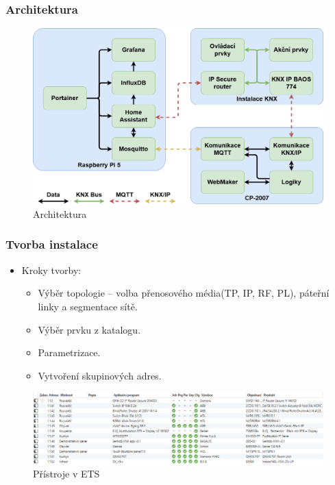 \documentclass[%
  12pt,       				%
	t,                  %
	aspectratio=1610,   %
	unicode,						%
]{beamer}				    	%
\begin{document}
\begin{frame} 
	\frametitle{Architektura}
			\begin{figure} [!ht]
				\centering
				\includegraphics[width=0.75\columnwidth]{obrazky/architecture.png}
				\caption{Architektura}
			\end{figure}
\end{frame}

\begin{frame} 
	\frametitle{Tvorba instalace}
	\begin{itemize}
		\item Kroky tvorby:
			\begin{itemize}
				\item Výběr topologie – volba přenosového média(TP, IP, RF, PL), páteřní linky a segmentace sítě.
				\item Výběr prvku z katalogu.
				\item Parametrizace.
				\item Vytvoření skupinových adres.
			\end{itemize}
	\end{itemize}
	\begin{figure} [!ht]	
		\centering
		\vspace{0.2cm}	              %
		\includegraphics[width=0.8\columnwidth]{obrazky/Přístroje v ETS.png}
		\caption{Přístroje v ETS}
	\end{figure}										%
\end{frame}
\end{document}

